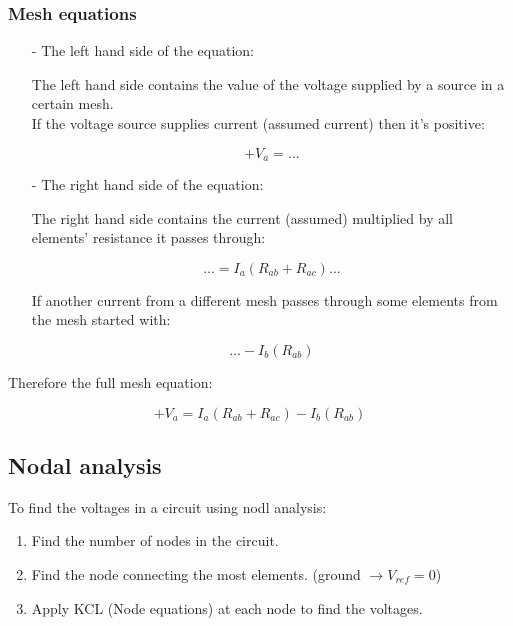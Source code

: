 \documentclass[a4paper]{book}
\begin{document}
\subsubsection{Mesh equations}

\begin{itemize}

  \item[-] The left hand side of the equation:

    The left hand side contains the value of the voltage supplied by a source in a certain mesh.\\
    If the voltage source supplies current (assumed current) then it's positive:

    \[+V_a = \dots\]

  \item[-] The right hand side of the equation:

    The right hand side contains the current (assumed) multiplied by all elements' resistance it passes through:

    \[\ldots = I_a(R_{ab} + R_{ac}) \ldots\]

    If another current from a different mesh passes through some elements from the mesh started with:

    \[\ldots - I_b(R_{ab})\]

\end{itemize}

Therefore the full mesh equation:

\[+V_a = I_a(R_{ab} + R_{ac}) - I_b(R_{ab})\]


\subsection{Nodal analysis}

To find the voltages in a circuit using nodl analysis:

\begin{enumerate}

  \item Find the number of nodes in the circuit.
  \item Find the node connecting the most elements. (ground $\to V_{ref} = 0$)
  \item Apply KCL (Node equations) at each node to find the voltages.

\end{enumerate}

\end{document}
